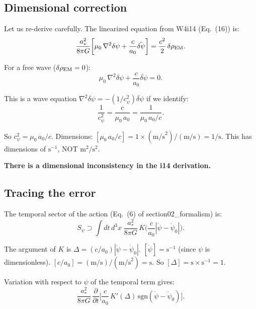 \documentclass[11pt]{article}
\begin{document}
\subsection{Dimensional correction}

Let us re-derive carefully. The linearized equation from W4i14 (Eq.~(16)) is:
\begin{equation}
\frac{a_*^2}{8\pi G}\biggl[\mu_0\,\nabla^2\delta\psi + \frac{c}{a_0}\ddot{\delta\psi}\biggr]
= \frac{c^2}{2}\,\delta\rho_{\rm EM}.
\end{equation}

For a free wave ($\delta\rho_{\rm EM} = 0$):
\begin{equation}
\mu_0\,\nabla^2\delta\psi + \frac{c}{a_0}\ddot{\delta\psi} = 0.
\end{equation}

This is a wave equation $\nabla^2\delta\psi = -(1/c_\psi^2)\ddot{\delta\psi}$
if we identify:
\begin{equation}
\frac{1}{c_\psi^2} = \frac{c}{\mu_0\,a_0} = \frac{1}{\mu_0\,a_0/c}.
\end{equation}

So $c_\psi^2 = \mu_0\,a_0/c$. Dimensions: $[\mu_0\,a_0/c] = 1 \times
(\text{m/s}^2)/(\text{m/s}) = 1/\text{s}$. This has dimensions of
$\text{s}^{-1}$, NOT $\text{m}^2/\text{s}^2$.

\textbf{There is a dimensional inconsistency in the i14 derivation.}

\subsection{Tracing the error}

The temporal sector of the action (Eq.~(6) of section02\_formalism) is:
\begin{equation}
S_\psi \supset \int dt\,d^3x\;\frac{a_*^2}{8\pi G}\,
K\!\biggl(\frac{c}{a_0}|\dot\psi - \dot\psi_0|\biggr).
\end{equation}

The argument of $K$ is $\Delta = (c/a_0)|\dot\psi - \dot\psi_0|$.
$[\dot\psi] = \text{s}^{-1}$ (since $\psi$ is dimensionless).
$[c/a_0] = (\text{m/s})/(\text{m/s}^2) = \text{s}$.
So $[\Delta] = \text{s} \times \text{s}^{-1} = 1$. \checkmark

Variation with respect to $\psi$ of the temporal term gives:
\begin{equation}
\frac{a_*^2}{8\pi G}\,\frac{\partial}{\partial t}\biggl[
\frac{c}{a_0}\,K'(\Delta)\,\text{sgn}(\dot\psi - \dot\psi_0)\biggr].
\end{equation}
\end{document}
